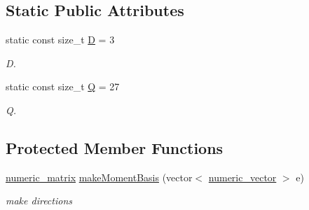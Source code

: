 \subsection*{Static Public Attributes}
\begin{DoxyCompactItemize}
\item 
\hypertarget{classnatrium_1_1D3Q27_a70ac295cb0d619520d3f9d1cc062a8f9}{
static const size\_\-t \hyperlink{classnatrium_1_1D3Q27_a70ac295cb0d619520d3f9d1cc062a8f9}{D} = 3}
\label{classnatrium_1_1D3Q27_a70ac295cb0d619520d3f9d1cc062a8f9}

\begin{DoxyCompactList}\small\item\em D. \item\end{DoxyCompactList}\item 
\hypertarget{classnatrium_1_1D3Q27_ad15f9c712c68bd3457bdf3560fd25226}{
static const size\_\-t \hyperlink{classnatrium_1_1D3Q27_ad15f9c712c68bd3457bdf3560fd25226}{Q} = 27}
\label{classnatrium_1_1D3Q27_ad15f9c712c68bd3457bdf3560fd25226}

\begin{DoxyCompactList}\small\item\em Q. \item\end{DoxyCompactList}\end{DoxyCompactItemize}
\subsection*{Protected Member Functions}
\begin{DoxyCompactItemize}
\item 
\hypertarget{classnatrium_1_1D3Q27_af8fb063c24736837bf33c19d2a376ca8}{
\hyperlink{namespacenatrium_ad8cbec7aab93a74837b06ded39615d47}{numeric\_\-matrix} \hyperlink{classnatrium_1_1D3Q27_af8fb063c24736837bf33c19d2a376ca8}{makeMomentBasis} (vector$<$ \hyperlink{namespacenatrium_a67c39077adc6634f8fa3762b8eef24c4}{numeric\_\-vector} $>$ e)}
\label{classnatrium_1_1D3Q27_af8fb063c24736837bf33c19d2a376ca8}

\begin{DoxyCompactList}\small\item\em make directions \item\end{DoxyCompactList}\end{DoxyCompactItemize}
